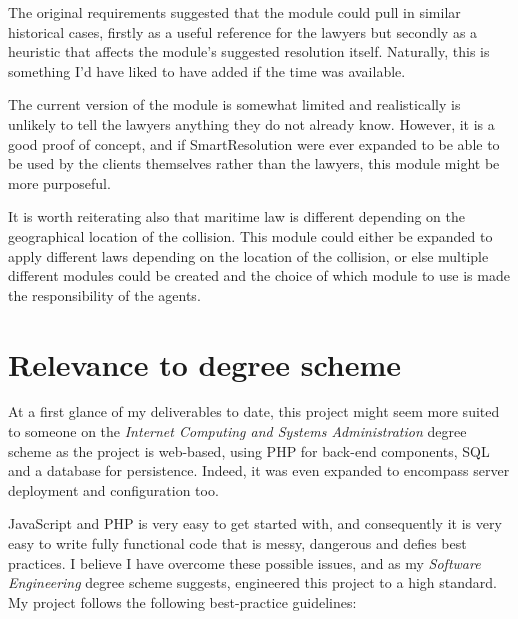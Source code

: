 The original requirements suggested that the module could pull in similar historical cases, firstly as a useful reference for the lawyers but secondly as a heuristic that affects the module's suggested resolution itself. Naturally, this is something I'd have liked to have added if the time was available.

The current version of the module is somewhat limited and realistically is unlikely to tell the lawyers anything they do not already know. However, it is a good proof of concept, and if SmartResolution were ever expanded to be able to be used by the clients themselves rather than the lawyers, this module might be more purposeful.

It is worth reiterating also that maritime law is different depending on the geographical location of the collision. This module could either be expanded to apply different laws depending on the location of the collision, or else multiple different modules could be created and the choice of which module to use is made the responsibility of the agents.

\section{Relevance to degree scheme}

At a first glance of my deliverables to date, this project might seem more suited to someone on the \emph{Internet Computing and Systems Administration} degree scheme as the project is web-based, using PHP for back-end components, SQL and a database for persistence. Indeed, it was even expanded to encompass server deployment and configuration too.

JavaScript and PHP is very easy to get started with, and consequently it is very easy to write fully functional code that is messy, dangerous and defies best practices. I believe I have overcome these possible issues, and as my \emph{Software Engineering} degree scheme suggests, engineered this project to a high standard. My project follows the following best-practice guidelines:


